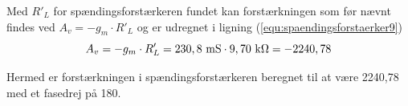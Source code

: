 Med $R'_L$ for spændingsforstærkeren fundet kan forstærkningen som før nævnt findes ved $A_v = -g_m \cdot R'_L$ og er udregnet i ligning (\ref{equ:spaendingsforstaerker9})
\begin{equation}
\label{equ:spaendingsforstaerker9}
A_v = -g_m \cdot R'_L = 230,8~\mathrm{mS} \cdot 9,70~\mathrm{k}\ohm = -2240,78
\end{equation}

Hermed er forstærkningen i spændingsforstærkeren beregnet til at være 2240,78 med et fasedrej på 180\degree .
